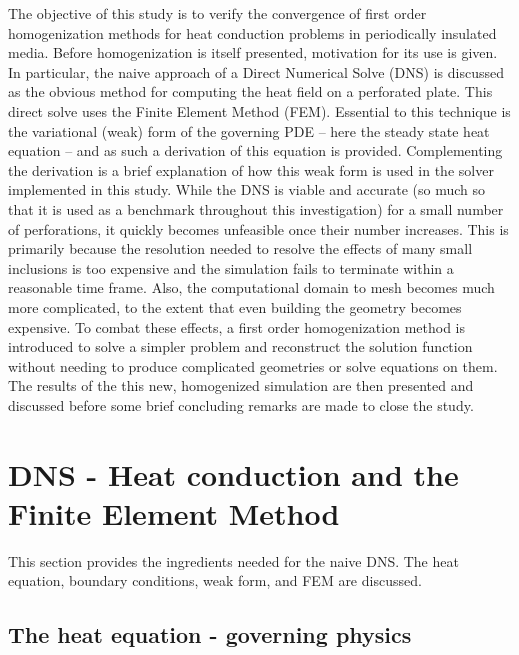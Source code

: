 \documentclass{article}
\makeatletter
\providecommand\FloatBarrier{\par\begingroup\let\@elt\relax
  \edef\@tempa{\@botlist\@deferlist\@dbldeferlist}%
  \ifx\@tempa\@empty\else\clearpage\fi\endgroup}
\makeatother
\begin{document}
The objective of this study is to verify the convergence of first order
homogenization methods for heat conduction problems in periodically insulated
media. Before homogenization is itself presented, motivation for its use is
given. In particular, the naive approach of a Direct Numerical Solve (DNS) is
discussed as the obvious method for computing the heat field on a perforated
plate. This direct solve uses the Finite Element Method (FEM). Essential to this technique is the variational (weak) form of the governing PDE -- here the steady state heat equation -- and as such a derivation of this equation is provided. Complementing the derivation is a
brief explanation of how this weak form is used in the solver implemented in
this study. While the DNS is viable and accurate (so much so that it is used
as a benchmark throughout this investigation) for a small number of
perforations, it quickly becomes unfeasible once their number increases. This
is primarily because the resolution needed to resolve the effects of many
small inclusions is too expensive and the simulation fails to terminate within
a reasonable time frame. Also, the computational domain to mesh becomes much
more complicated, to the extent that even building the geometry becomes
expensive. To combat these effects, a first order homogenization method is
introduced to solve a simpler problem and reconstruct the solution function
without needing to produce complicated geometries or solve equations on them.
The results of the this new, homogenized simulation are then presented and discussed before some brief concluding remarks are made to close the study.

\FloatBarrier
\section{DNS - Heat conduction and the Finite Element Method}

This section provides the ingredients needed for the naive DNS. The heat
equation, boundary conditions, weak form, and FEM are discussed.

\FloatBarrier
\subsection{The heat equation - governing physics}
\end{document}
